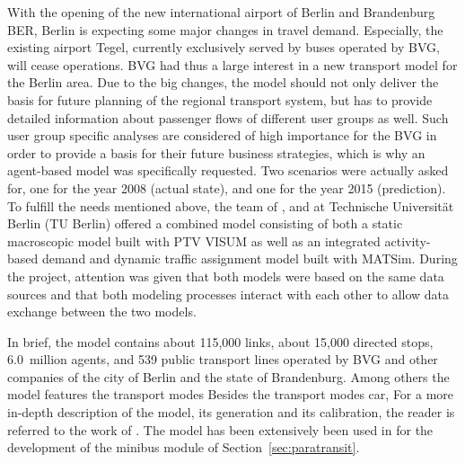 With the opening of the new international airport of Berlin and Brandenburg BER,
Berlin is expecting some major changes in travel demand. Especially, the
existing airport Tegel, currently exclusively served by buses operated by BVG,
will cease operations. BVG had thus a large interest in a new transport model
for the Berlin area. Due to the big changes, the model should not only deliver
the basis for future planning of the regional transport system, but has to
provide detailed information about passenger flows of different user groups as
well. Such user group specific analyses are considered of high importance for
the BVG in order to provide a basis for their future business strategies, which
is why an agent-based model was specifically requested. Two scenarios were
actually asked for, one for the year 2008 (actual state), and one for the year
2015 (prediction). To fulfill the needs mentioned above, the team of 
\citet{PTV2013}, \citet{Senozon2013} and \citet{VSP2013} at Technische Universit{\"a}t Berlin (TU Berlin)
offered a combined model consisting of both a static macroscopic model built with
PTV VISUM \citep{VISUM2013} as well as an integrated activity-based demand and
dynamic traffic assignment model built with MATSim. During
the project, attention was given that both models were based on the same data
sources and that both modeling processes interact with each other to allow data
exchange between the two models.

In
brief, the model contains about 115,000 links, %
about 15,000 directed stops, %
6.0~million agents, %
and 539 public transport lines operated by BVG and other companies of the city
of Berlin and the state of Brandenburg. Among others the model features the transport modes Besides the transport modes car, For a more in-depth description of the
model, its generation and its calibration, the reader is referred to the work of
\cite{NeumannEtAl2014IatbrPtBerlinBook}. The model has been extensively been used in \citet[][Ch 7/8]{Neumann2014PhD} for the development of the minibus module of Section~\ref{sec:paratransit}.

%
